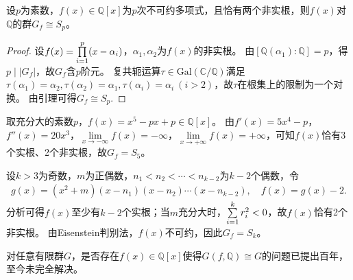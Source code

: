 \documentclass[../../main.tex]{subfiles}%
\begin{document}
\begin{theorem}
设$p$为素数，$f(x)\in\mathbb{Q}[x]$为$p$次不可约多项式，且恰有两个非实根，则$f(x)$对$\mathbb{Q}$的群$G_f\cong S_p$。
\end{theorem}

\begin{proof}

设$f(x)=\prod\limits_{i=1}^p\limits (x-\alpha_i)$，$\alpha_1,\alpha_2$为$f(x)$的非实根。
由$[\mathbb{Q}(\alpha_1):\mathbb{Q}]=p$，得$p\mid |G_f|$，故$G_f$含$p$阶元。
复共轭运算$\tau\in\mathrm{Gal}(\mathbb{C}/\mathbb{Q})$满足$\tau(\alpha_1)=\alpha_2,\tau(\alpha_2)=\alpha_1,\tau(\alpha_i)=\alpha_i\ (i>2)$，故$\tau$在根集上的限制为一个对换。
由引理可得$G_f\cong S_p$.

\end{proof}

\begin{example}
取充分大的素数$p$，$f(x)=x^5-px+p\in\mathbb{Q}[x]$。
由$f'(x)=5x^4-p$，$f''(x)=20x^3$，$\lim\limits_{x\to-\infty}f(x)=-\infty$，$\lim\limits_{x\to+\infty}f(x)=+\infty$，可知$f(x)$恰有3个实根、2个非实根，故$G_f=S_5$。
\end{example}

\begin{example}
设$k>3$为奇数，$m$为正偶数，$n_1<n_2<\cdots<n_{k-2}$为$k-2$个偶数，令
\begin{align*}
g(x)=(x^2+m)(x-n_1)(x-n_2)\cdots(x-n_{k-2}),\quad f(x)=g(x)-2.
\end{align*}
分析可得$f(x)$至少有$k-2$个实根；当$m$充分大时，$\sum\limits_{i=1}^k\limits r_i^2<0$，故$f(x)$恰有2个非实根。
由Eisenstein判别法，$f(x)$不可约，因此$G_f=S_k$。
\end{example}

\begin{remark}
对任意有限群$G$，是否存在$f(x)\in\mathbb{Q}[x]$使得$G(f,\mathbb{Q})\cong G$的问题已提出百年，至今未完全解决。
\end{remark}
\end{document}

